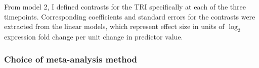 From model 2, I defined contrasts for the \gls{TRI} specifically at each of the three timepoints.
%
Corresponding coefficients and standard errors for the contrasts were extracted from the linear models, which represent effect size in units of $\log_2$ expression fold change per unit change in predictor value.

\subsubsection{Choice of  meta-analysis method}
\label{subsubsec:hird_dge_meta_methodChoice}

